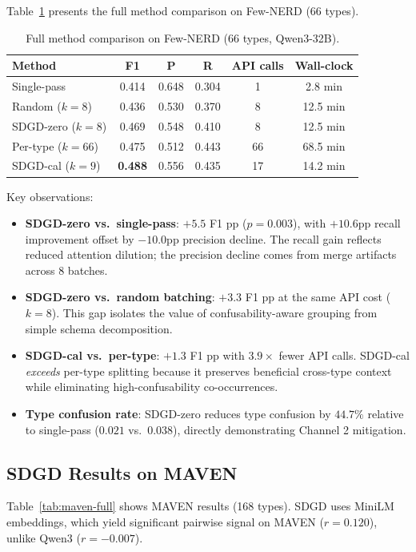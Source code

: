 \documentclass[11pt,a4paper]{article}
\begin{document}
Table~\ref{tab:fewnerd-full} presents the full method comparison on Few-NERD (66 types).

\begin{table}[t]
\centering
\small
\caption{Full method comparison on Few-NERD (66 types, Qwen3-32B).}
\label{tab:fewnerd-full}
\begin{tabular}{lccccc}
\toprule
Method & F1 & P & R & API calls & Wall-clock \\
\midrule
Single-pass       & 0.414 & 0.648 & 0.304 & 1  & 2.8 min \\
Random ($k{=}8$)  & 0.436 & 0.530 & 0.370 & 8  & 12.5 min \\
SDGD-zero ($k{=}8$) & 0.469 & 0.548 & 0.410 & 8  & 12.5 min \\
Per-type ($k{=}66$)  & 0.475 & 0.512 & 0.443 & 66 & 68.5 min \\
SDGD-cal ($k{=}9$)  & \textbf{0.488} & 0.556 & 0.435 & 17 & 14.2 min \\
\bottomrule
\end{tabular}
\end{table}

Key observations:
\begin{itemize}
\item \textbf{SDGD-zero vs.\ single-pass}: $+5.5$ F1 pp ($p{=}0.003$), with $+10.6$pp recall improvement offset by $-10.0$pp precision decline. The recall gain reflects reduced attention dilution; the precision decline comes from merge artifacts across 8 batches.
\item \textbf{SDGD-zero vs.\ random batching}: $+3.3$ F1 pp at the same API cost ($k{=}8$). This gap isolates the value of confusability-aware grouping from simple schema decomposition.
\item \textbf{SDGD-cal vs.\ per-type}: $+1.3$ F1 pp with $3.9\times$ fewer API calls. SDGD-cal \emph{exceeds} per-type splitting because it preserves beneficial cross-type context while eliminating high-confusability co-occurrences.
\item \textbf{Type confusion rate}: SDGD-zero reduces type confusion by $44.7\%$ relative to single-pass ($0.021$ vs.\ $0.038$), directly demonstrating Channel 2 mitigation.
\end{itemize}


\subsection{SDGD Results on MAVEN}
\label{sec:sdgd-maven}

Table~\ref{tab:maven-full} shows MAVEN results (168 types).
SDGD uses MiniLM embeddings, which yield significant pairwise signal on MAVEN ($r{=}0.120$), unlike Qwen3 ($r{=}{-}0.007$).
\end{document}
